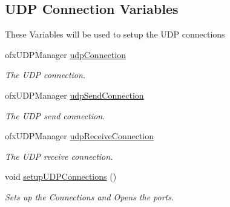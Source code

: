 \subsection*{U\-D\-P Connection Variables}
\label{_amgrpae40690cdbe7726518333e6d2c1b11b8}%
These Variables will be used to setup the U\-D\-P connections \begin{DoxyCompactItemize}
\item 
\hypertarget{classtest_app_a30c39505591fda7ed8ef4d8c4f0128fd}{ofx\-U\-D\-P\-Manager \hyperlink{classtest_app_a30c39505591fda7ed8ef4d8c4f0128fd}{udp\-Connection}}\label{classtest_app_a30c39505591fda7ed8ef4d8c4f0128fd}

\begin{DoxyCompactList}\small\item\em The U\-D\-P connection. \end{DoxyCompactList}\item 
\hypertarget{classtest_app_a35f96e427475843d44539f125ca454cd}{ofx\-U\-D\-P\-Manager \hyperlink{classtest_app_a35f96e427475843d44539f125ca454cd}{udp\-Send\-Connection}}\label{classtest_app_a35f96e427475843d44539f125ca454cd}

\begin{DoxyCompactList}\small\item\em The U\-D\-P send connection. \end{DoxyCompactList}\item 
\hypertarget{classtest_app_a630d5b8b53aee0c07dc79db616f4eb48}{ofx\-U\-D\-P\-Manager \hyperlink{classtest_app_a630d5b8b53aee0c07dc79db616f4eb48}{udp\-Receive\-Connection}}\label{classtest_app_a630d5b8b53aee0c07dc79db616f4eb48}

\begin{DoxyCompactList}\small\item\em The U\-D\-P receive connection. \end{DoxyCompactList}\item 
\hypertarget{classtest_app_a0d5c58a4c1ebdb291618b34d5237f77b}{void \hyperlink{classtest_app_a0d5c58a4c1ebdb291618b34d5237f77b}{setup\-U\-D\-P\-Connections} ()}\label{classtest_app_a0d5c58a4c1ebdb291618b34d5237f77b}

\begin{DoxyCompactList}\small\item\em Sets up the Connections and Opens the ports. \end{DoxyCompactList}\end{DoxyCompactItemize}
